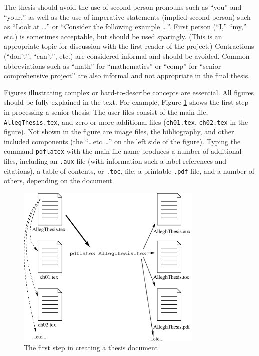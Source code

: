 The thesis should avoid the use of second-person pronouns such as ``you''
and ``your,'' as well as the use of imperative statements (implied
second-person) such as ``Look
at \ldots'' or ``Consider the following example \ldots''. 
First person (``I,'' ``my,'' etc.) is sometimes acceptable, 
but should be used sparingly. (This is an appropriate topic 
for discussion with the first reader of the project.) Contractions (``don't'',
``can't'', etc.) are considered informal and should be avoided. Common
abbreviations such as ``math'' for ``mathematics'' or ``comp'' for 
``senior comprehensive project''  are also informal and not appropriate
in the final thesis.

Figures illustrating complex or hard-to-describe concepts are essential.
All figures should be fully explained in the text. For example,
Figure \ref{latexprocess} shows the first step in processing a senior thesis.
The user files consist of the main file, {\tt AllegThesis.tex}, and zero or
more additional files ({\tt ch01.tex}, {\tt ch02.tex} in the figure). Not shown
in the figure are image files, the bibliography, and other included
components (the ``\ldots etc.\ldots'' on the left side of the figure). 
Typing the command {\tt pdflatex} with the main file name
produces a number of additional files, including an {\tt .aux} file (with
information such a label references and citations),
a table of contents, or {\tt .toc}, file, a printable {\tt .pdf} file, and
a number of others, depending on the document.


\begin{figure}[htbp]
\centering
\includegraphics[width=3.5in]{latexprocess}
\caption{The first step in creating a thesis document}
\label{latexprocess}
\end{figure}

